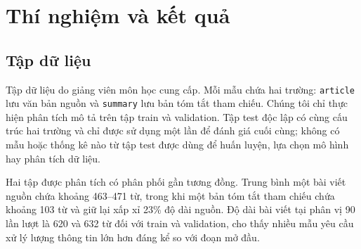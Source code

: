 \documentclass[conference]{IEEEtran}
\begin{document}
\section{Thí nghiệm và kết quả}

\subsection{Tập dữ liệu}
Tập dữ liệu do giảng viên môn học cung cấp. Mỗi mẫu chứa hai trường: \texttt{article} lưu văn bản nguồn và \texttt{summary} lưu bản tóm tắt tham chiếu. Chúng tôi chỉ thực hiện phân tích mô tả trên tập train và validation. Tập test độc lập có cùng cấu trúc hai trường và chỉ được sử dụng một lần để đánh giá cuối cùng; không có mẫu hoặc thống kê nào từ tập test được dùng để huấn luyện, lựa chọn mô hình hay phân tích dữ liệu.

\begin{table}[htbp]
\centering
\caption{Thống kê độ dài train/validation theo đơn vị từ Unicode.}
\label{tab:dataset}
\end{table}

Hai tập được phân tích có phân phối gần tương đồng. Trung bình một bài viết nguồn chứa khoảng 463--471 từ, trong khi một bản tóm tắt tham chiếu chứa khoảng 103 từ và giữ lại xấp xỉ 23\% độ dài nguồn. Độ dài bài viết tại phân vị 90 lần lượt là 620 và 632 từ đối với train và validation, cho thấy nhiều mẫu yêu cầu xử lý lượng thông tin lớn hơn đáng kể so với đoạn mở đầu.
\end{document}
